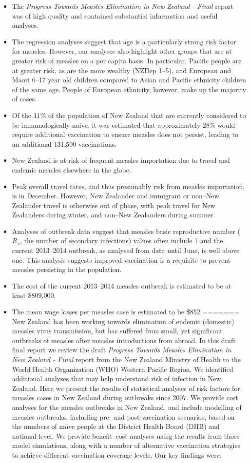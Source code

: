 \documentclass{article}
\begin{document}
\begin{itemize}
\item The \emph {Progress Towards Measles Elimination in New Zealand - Final} report was of high quality and contained substantial information and useful analyses.
\item The regression analyses suggest that age is a particularly strong risk factor for measles. However, our analyses also highlight other groups that are at greater risk of measles on a per capita basis. In particular, Pacific people are at greater risk, as are the more wealthy (NZDep 1--5), and European and Maori 6--17 year old children compared to Asian and Pacific ethnicity children of the same age. People of European ethnicity, however, make up the majority of cases.
\item Of the 11\% of the population of New Zealand that are currently considered to be immunologically naive, it was estimated that approximately 28\% would require additional vaccination to ensure measles does not persist, leading to an additional 131,500 vaccinations.
\item New Zealand is at risk of frequent measles importation due to travel and endemic measles elsewhere in the globe.
\item Peak overall travel rates, and thus presumably risk from measles importation, is in December. However, New Zealander and immigrant or non--New Zealander travel is otherwise out of phase, with peak travel for New Zealanders during winter, and non--New Zealanders during summer.
\item Analyses of outbreak data suggest that measles basic reproductive number ($R_v$, the number of secondary infections) values often include 1 and the current 2013--2014 outbreak, as analysed from data until June, is well above one. This analysis suggests improved vaccination is a requisite to prevent measles persisting in the population.
\item The cost of the current 2013--2014 measles outbreak is estimated to be at least \$809,000.
\item The mean wage losses per measles case is estimated to be \$852
=======
New Zealand has been working towards elimination of endemic (domestic) measles virus transmission, but has suffered from small, yet significant outbreaks of measles after measles introductions from abroad. In this draft final report we review the draft \emph {Progress Towards Measles Elimination in New Zealand - Final} report from the New Zealand Ministry of Health to the World Health Organization (WHO) Western Pacific Region. We identified additional analyses that may help understand risk of infection in New Zealand. Here we present the results of statistical analyses of risk factors for measles cases in New Zealand during outbreaks since 2007. We provide cost analyses for the measles outbreaks in New Zealand, and include modelling of measles outbreaks, including pre- and post-vaccination scenarios, based on the numbers of na\"{\i}ve people at the District Health Board (DHB) and national level. We provide benefit--cost analyses using the results from those model simulations, along with a number of alternative vaccination strategies to achieve different vaccination coverage levels. Our key findings were:


\end{itemize}
\end{document}
